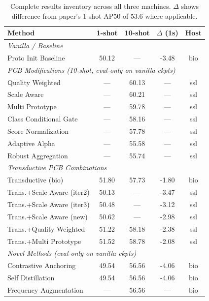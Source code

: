 \documentclass[11pt,a4paper]{article}
\begin{document}
\begin{table}[h!]
\centering
\caption{Complete results inventory across all three machines. $\Delta$ shows difference from paper's 1-shot AP50 of 53.6 where applicable.}
\small
\begin{tabular}{p{5.5cm}cccc}
\toprule
\textbf{Method} & \textbf{1-shot} & \textbf{10-shot} & \textbf{$\Delta$ (1s)} & \textbf{Host} \\
\midrule
\multicolumn{5}{l}{\textit{Vanilla / Baseline}} \\
Proto Init Baseline & 50.12 & --- & \textcolor{worse}{-3.48} & bio \\
\midrule
\multicolumn{5}{l}{\textit{PCB Modifications (10-shot, eval-only on vanilla ckpts)}} \\
Quality Weighted & --- & 60.13 & --- & ssl \\
Scale Aware & --- & 60.21 & --- & ssl \\
Multi Prototype & --- & 59.78 & --- & ssl \\
Class Conditional Gate & --- & 58.16 & --- & ssl \\
Score Normalization & --- & 57.78 & --- & ssl \\
Adaptive Alpha & --- & 55.58 & --- & ssl \\
Robust Aggregation & --- & 55.74 & --- & ssl \\
\midrule
\multicolumn{5}{l}{\textit{Transductive PCB Combinations}} \\
Transductive (bio) & 51.80 & 57.73 & \textcolor{worse}{-1.80} & bio \\
Trans.+Scale Aware (iter2) & 50.13 & --- & \textcolor{worse}{-3.47} & ssl \\
Trans.+Scale Aware (iter3) & 50.48 & --- & \textcolor{worse}{-3.12} & ssl \\
Trans.+Scale Aware (new) & 50.62 & --- & \textcolor{worse}{-2.98} & ssl \\
Trans.+Quality Weighted & 51.22 & 58.18 & \textcolor{worse}{-2.38} & ssl \\
Trans.+Multi Prototype & 51.52 & 58.78 & \textcolor{worse}{-2.08} & ssl \\
\midrule
\multicolumn{5}{l}{\textit{Novel Methods (eval-only on vanilla ckpts)}} \\
Contrastive Anchoring & 49.54 & 56.56 & \textcolor{worse}{-4.06} & bio \\
Self Distillation & 49.54 & 56.56 & \textcolor{worse}{-4.06} & bio \\
Frequency Augmentation & --- & 56.56 & --- & bio \\

\end{tabular}
\end{table}
\end{document}

